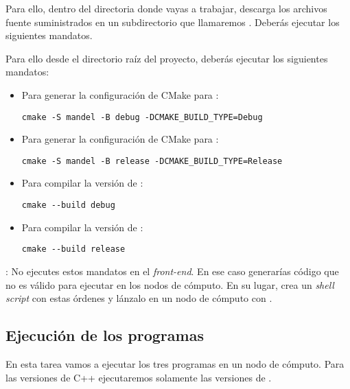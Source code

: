 Para ello, dentro del directoria donde vayas a trabajar, descarga los archivos
fuente suministrados en un subdirectorio que llamaremos .
Deberás ejecutar los siguientes mandatos.

Para ello desde el directorio raíz del proyecto, deberás ejecutar los siguientes
mandatos:

\begin{itemize}
  \item Para generar la configuración de CMake para :
\begin{lstlisting}[style=terminal]
cmake -S mandel -B debug -DCMAKE_BUILD_TYPE=Debug
\end{lstlisting}

  \item Para generar la configuración de CMake para :
\begin{lstlisting}[style=terminal]
cmake -S mandel -B release -DCMAKE_BUILD_TYPE=Release
\end{lstlisting}

  \item Para compilar la versión de :
\begin{lstlisting}[style=terminal]
cmake --build debug
\end{lstlisting}

  \item Para compilar la versión de :
\begin{lstlisting}[style=terminal]
cmake --build release
\end{lstlisting}

\end{itemize}

: No ejecutes estos mandatos en el \emph{front-end}.
En ese caso generarías código que no es válido para ejecutar en los 
nodos de cómputo. En su lugar, crea un \emph{shell script} con estas
órdenes y lánzalo en un nodo de cómputo con .

\subsection{Ejecución de los programas}

En esta tarea vamos a ejecutar los tres programas en un nodo de cómputo.
Para las versiones de C++ ejecutaremos solamente las versiones de .

